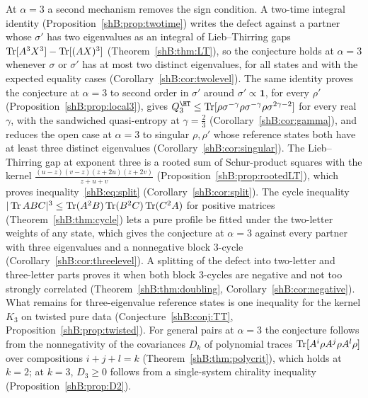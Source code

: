 At $\alpha=3$ a second mechanism removes the sign condition. A two-time integral identity (Proposition~\ref{shB:prop:twotime}) writes the defect against a partner whose $\sigma'$ has two eigenvalues as an integral of Lieb--Thirring gaps $\operatorname{Tr}[A^3X^3]-\operatorname{Tr}[(AX)^3]$ (Theorem~\ref{shB:thm:LT}), so the conjecture holds at $\alpha=3$ whenever $\sigma$ or $\sigma'$ has at most two distinct eigenvalues, for all states and with the expected equality cases (Corollary~\ref{shB:cor:twolevel}). The same identity proves the conjecture at $\alpha=3$ to second order in $\sigma'$ around $\sigma'\propto\mathbf 1$, for every $\rho'$ (Proposition~\ref{shB:prop:local3}), gives $Q^\HT_3\le\Tr[\rho\sigma^{-\gamma}\rho\sigma^{-\gamma}\rho\sigma^{2\gamma-2}]$ for every real $\gamma$, with the sandwiched quasi-entropy at $\gamma=\frac23$ (Corollary~\ref{shB:cor:gamma}), and reduces the open case at $\alpha=3$ to singular $\rho,\rho'$ whose reference states both have at least three distinct eigenvalues (Corollary~\ref{shB:cor:singular}). The Lieb--Thirring gap at exponent three is a rooted sum of Schur-product squares with the kernel $\frac{(u-z)(v-z)(z+2u)(z+2v)}{z+u+v}$ (Proposition~\ref{shB:prop:rootedLT}), which proves inequality~\eqref{shB:eq:split} (Corollary~\ref{shB:cor:split}). The cycle inequality $|\operatorname{Tr} ABC|^3\le\operatorname{Tr}(A^2B)\operatorname{Tr}(B^2C)\operatorname{Tr}(C^2A)$ for positive matrices (Theorem~\ref{shB:thm:cycle}) lets a pure profile be fitted under the two-letter weights of any state, which gives the conjecture at $\alpha=3$ against every partner with three eigenvalues and a nonnegative block $3$-cycle (Corollary~\ref{shB:cor:threelevel}). A splitting of the defect into two-letter and three-letter parts proves it when both block $3$-cycles are negative and not too strongly correlated (Theorem~\ref{shB:thm:doubling}, Corollary~\ref{shB:cor:negative}). What remains for three-eigenvalue reference states is one inequality for the kernel $K_3$ on twisted pure data (Conjecture~\ref{shB:conj:TT}, Proposition~\ref{shB:prop:twisted}). For general pairs at $\alpha=3$ the conjecture follows from the nonnegativity of the covariances $D_k$ of polynomial traces $\operatorname{Tr}[A^i\rho A^j\rho A^l\rho]$ over compositions $i+j+l=k$ (Theorem~\ref{shB:thm:polycrit}), which holds at $k=2$; at $k=3$, $D_3\ge0$ follows from a single-system chirality inequality (Proposition~\ref{shB:prop:D2}).

